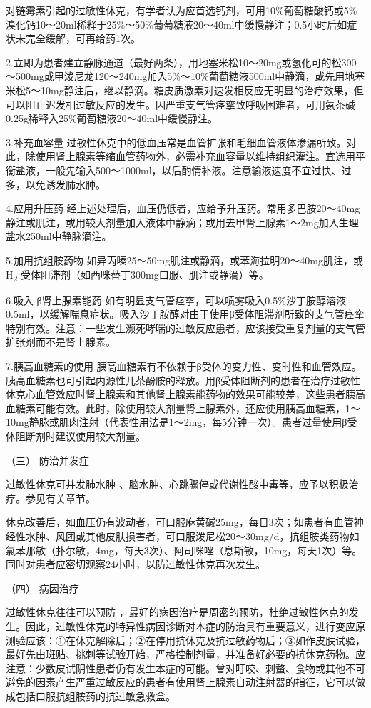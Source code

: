 对链霉素引起的过敏性休克，有学者认为应首选钙剂，可用10\%葡萄糖酸钙或5\%溴化钙10～20ml稀释于25\%～50\%葡萄糖液20～40ml中缓慢静注；0.5小时后如症状未完全缓解，可再给药1次。

2.立即为患者建立静脉通道（最好两条），用地塞米松10～20mg或氢化可的松300～500mg或甲泼尼龙120～240mg加入5\%～10\%葡萄糖液500ml中静滴，或先用地塞米松5～10mg静注后，继以静滴。糖皮质激素对速发相反应无明显的治疗效果，但可以阻止迟发相过敏反应的发生。因严重支气管痉挛致呼吸困难者，可用氨茶碱0.25g稀释入25\%葡萄糖液20～40ml中缓慢静注。

3.补充血容量
过敏性休克中的低血压常是血管扩张和毛细血管液体渗漏所致。对此，除使用肾上腺素等缩血管药物外，必需补充血容量以维持组织灌注。宜选用平衡盐液，一般先输入500～1000ml，以后酌情补液。注意输液速度不宜过快、过多，以免诱发肺水肿。

4.应用升压药
经上述处理后，血压仍低者，应给予升压药。常用多巴胺20～40mg静注或肌注，或用较大剂量加入液体中静滴；或用去甲肾上腺素1～2mg加入生理盐水250ml中静脉滴注。

5.加用抗组胺药物
如异丙嗪25～50mg肌注或静滴，或苯海拉明20～40mg肌注，或H\textsubscript{2}
受体阻滞剂（如西咪替丁300mg口服、肌注或静滴）等。

6.吸入 β肾上腺素能药
如有明显支气管痉挛，可以喷雾吸入0.5\%沙丁胺醇溶液0.5ml，以缓解喘息症状。吸入沙丁胺醇对由于使用β受体阻滞剂所致的支气管痉挛特别有效。注意：一些发生濒死哮喘的过敏反应患者，应该接受重复剂量的支气管扩张剂而不是肾上腺素。

7.胰高血糖素的使用
胰高血糖素有不依赖于β受体的变力性、变时性和血管效应。胰高血糖素也可引起内源性儿茶酚胺的释放。用β受体阻断剂的患者在治疗过敏性休克心血管效应时肾上腺素和其他肾上腺素能药物的效果可能较差，这些患者胰高血糖素可能有效。此时，除使用较大剂量肾上腺素外，还应使用胰高血糖素，1～10mg静脉或肌肉注射（代表性用法是1～2mg，每5分钟一次）。患者过量使用β受体阻断剂时建议使用较大剂量。

\hypertarget{text00063.htmlux5cux23CHP2-5-3-3}{}
（三） 防治并发症

过敏性休克可并发肺水肿
、脑水肿、心跳骤停或代谢性酸中毒等，应予以积极治疗。参见有关章节。

休克改善后，如血压仍有波动者，可口服麻黄碱25mg，每日3次；如患者有血管神经性水肿、风团或其他皮肤损害者，可口服泼尼松20～30mg/d，抗组胺类药物如氯苯那敏（扑尔敏，4mg，每天3次）、阿司咪唑（息斯敏，10mg，每天1次）等。同时对患者应密切观察24小时，以防过敏性休克再次发生。

\hypertarget{text00063.htmlux5cux23CHP2-5-3-4}{}
（四） 病因治疗

过敏性休克往往可以预防
，最好的病因治疗是周密的预防，杜绝过敏性休克的发生。因此，过敏性休克的特异性病因诊断对本症的防治具有重要意义，进行变应原测验应该：①在休克解除后；②在停用抗休克及抗过敏药物后；③如作皮肤试验，最好先由斑贴、挑刺等试验开始，严格控制剂量，并准备好必要的抗休克药物。应注意：少数皮试阴性患者仍有发生本症的可能。曾对叮咬、刺螫、食物或其他不可避免的因素产生严重过敏反应的患者有使用肾上腺素自动注射器的指征，它可以做成包括口服抗组胺药的抗过敏急救盒。


